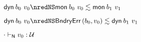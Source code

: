 {\begin{lamportproof*}
    \begin{pfproof}
        \begin{pfproof}
          \qedstep
            \begin{pfproof}
              $\edynb{\sbnd_0}{\svalue_0} \nredNS \rexpr{\emon{\sbnd_0}{\svalue_0}}{\emon{\sbnd_1}{\svalue_1}}$
            \end{pfproof}
        \end{pfproof}
        \begin{pfproof}
          \qedstep
            \begin{pfproof}
              $\edynb{\sbnd_0}{\svalue_0} \nredNS \rexpr{\boundaryerror{\sbnd_0}{\svalue_0}}{\edynb{\sbnd_1}{\svalue_1}}$
            \end{pfproof}
        \end{pfproof}
    \end{pfproof}

    \begin{pfproof}
      \absurdstep
        \begin{pfproof}
          ${\cdot} \vdash_{\mathsf{N}} v_0 : {\mathcal U}$
        \end{pfproof}
    \end{pfproof}


\end{lamportproof*}}
